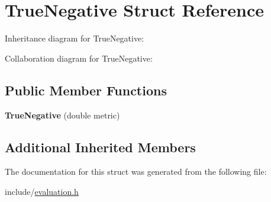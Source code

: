 \hypertarget{structTrueNegative}{}\section{True\+Negative Struct Reference}
\label{structTrueNegative}


Inheritance diagram for True\+Negative\+:


Collaboration diagram for True\+Negative\+:
\subsection*{Public Member Functions}
\begin{DoxyCompactItemize}
\item 
\mbox{\label{structTrueNegative_ab971933e35e0f4cec5df4b6975fe3e3a}} 
{\bfseries True\+Negative} (double metric)
\end{DoxyCompactItemize}
\subsection*{Additional Inherited Members}


The documentation for this struct was generated from the following file\+:\begin{DoxyCompactItemize}
\item 
include/\hyperlink{evaluation_8h}{evaluation.\+h}\end{DoxyCompactItemize}
